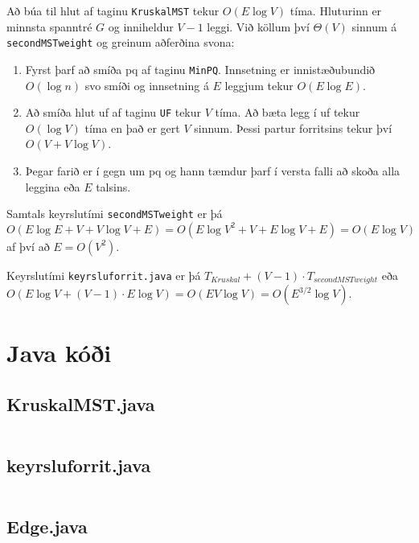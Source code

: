\documentclass[a4paper,oneside]{article}
\begin{document}
Að búa til hlut af taginu \texttt{KruskalMST} tekur $O(E \log V)$ tíma. Hluturinn er minnsta spanntré $G$ og inniheldur $V-1$ leggi. Við köllum því $\Theta(V)$ sinnum á \texttt{secondMSTweight} og greinum aðferðina svona:
\begin{enumerate}
    \item Fyrst þarf að smíða pq af taginu \texttt{MinPQ}. Innsetning er innistæðubundið $O(\log n)$ svo smíði og innsetning á $E$ leggjum tekur $O(E \log E)$.
    \item Að smíða hlut uf af taginu \texttt{UF} tekur $V$ tíma. Að bæta legg í uf tekur $O(\log V)$ tíma en það er gert $V$ sinnum. Þessi partur forritsins tekur því $O(V +  V \log V)$.
    \item Þegar farið er í gegn um pq og hann tæmdur þarf í versta falli að skoða alla leggina eða $E$ talsins.
\end{enumerate}
Samtals keyrslutími \texttt{secondMSTweight} er þá $O(E \log E + V + V \log V + E) = O(E \log V^2 + V + E \log V + E) = O(E \log V)$ af því að $E = O(V^2)$.

Keyrslutími \texttt{keyrsluforrit.java} er þá $T_{Kruskal} + (V-1) \cdot T_{secondMSTweight}$ eða $O(E \log V + (V-1) \cdot E \log V) = O(EV \log V) = O(E^{3/2} \log V)$.

\pagebreak
\section{Java kóði}
\subsection{KruskalMST.java}
\inputminted[]{java}{../KruskalMST.java}

\subsection{keyrsluforrit.java}
\inputminted[]{java}{../keyrsluforrit.java}

\subsection{Edge.java}
\inputminted[firstline=91,firstnumber=91,lastline=131]{java}{../Edge.java}
\end{document}

